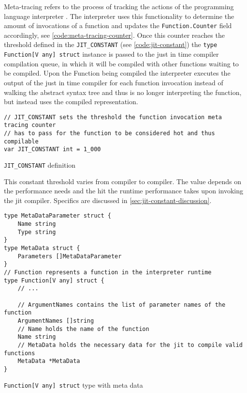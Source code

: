 Meta-tracing refers to the process of tracking the actions of the programming
language interpreter \cite[4.1 Meta-tracing]{bolz2015impact}. The interpreter
uses this functionality to determine the amount of invocations of a function
and updates the \texttt{Function.Counter} field accordingly, see
\autoref{code:meta-tracing-counter}. Once this counter reaches the threshold
defined in the \texttt{JIT\_CONSTANT} (see \autoref{code:jit-constant}) the
\texttt{type Function[V any] struct} instance is passed to the just in
time compiler compilation queue, in which it will be compiled with other
functions waiting to be compiled. Upon the Function being compiled the
interpreter executes the output of the just in time compiler for each function
invocation instead of walking the abstract syntax tree and thus is no longer
interpreting the function, but instead uses the compiled representation.

\begin{listing}[H]
    \begin{verbatim}
// JIT_CONSTANT sets the threshold the function invocation meta tracing counter
// has to pass for the function to be considered hot and thus compilable
var JIT_CONSTANT int = 1_000
    \end{verbatim}
    \caption{\texttt{JIT\_CONSTANT} definition}
    \label{code:jit-constant}
\end{listing}

This constant threshold varies from compiler to compiler. The value depends on
the performance needs and the hit the runtime performance takes upon
invoking the jit compiler. Specifics are discussed in \autoref{sec:jit-constant-discussion}.

\begin{listing}[H]
    \begin{verbatim}
type MetaDataParameter struct {
	Name string
	Type string
}
type MetaData struct {
	Parameters []MetaDataParameter
}
// Function represents a function in the interpreter runtime
type Function[V any] struct {
    // ...

    // ArgumentNames contains the list of parameter names of the function
    ArgumentNames []string
    // Name holds the name of the function
    Name string
    // MetaData holds the necessary data for the jit to compile valid functions
    MetaData *MetaData
}
    \end{verbatim}
    \caption{\texttt{Function[V any] struct} type with meta data}
    \label{code:meta-tracing-meta-data}
\end{listing}

